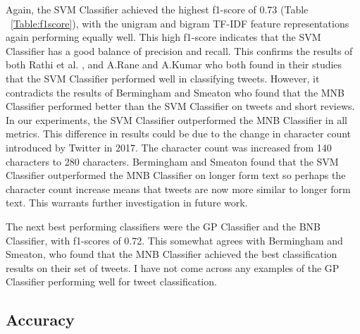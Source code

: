 Again, the SVM Classifier achieved the highest f1-score of 0.73 (Table ~\ref{Table:f1score}), with the unigram and bigram TF-IDF feature representations again performing equally well. This high f1-score indicates that the SVM Classifier has a good balance of precision and recall. This confirms the results of both Rathi et al. \cite{Raithi2018}, and A.Rane and A.Kumar \cite{Rane2018} who both found in their studies that the SVM Classifier performed well in classifying tweets. However, it contradicts the results of Bermingham and Smeaton \cite{Berm2010} who found that the MNB Classifier performed better than the SVM Classifier on tweets and short reviews. In our experiments, the SVM Classifier outperformed the MNB Classifier in all metrics. This difference in results could be due to the change in character count introduced by Twitter in 2017. The character count was increased from 140 characters to 280 characters. Bermingham and Smeaton \cite{Berm2010} found that the SVM Classifier outperformed the MNB Classifier on longer form text so perhaps the character count increase means that tweets are now more similar to longer form text. This warrants further investigation in future work.

The next best performing classifiers were the GP Classifier and the BNB Classifier, with f1-scores of 0.72. This somewhat agrees with Bermingham and Smeaton, who found that the MNB Classifier achieved the best classification results on their set of tweets. I have not come across any examples of the GP Classifier performing well for tweet classification.

\subsection{Accuracy}

